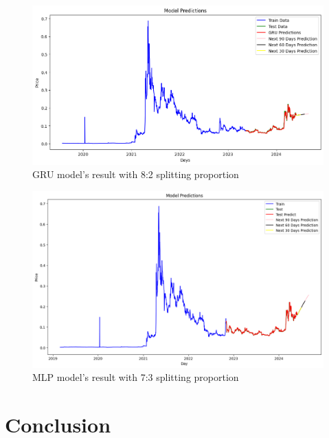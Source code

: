 \documentclass{ieeeojies}
\begin{document}
\begin{figure}[H]
  \centering
  \begin{minipage}{0.8\linewidth}
    \centering
    \includegraphics[width=\linewidth]{Image/GRU/GRU_DOGE_82_n.png}
    \caption{GRU model's result with 8:2 splitting proportion}
    \label{fig:29}
  \end{minipage}
\end{figure}
\vspace{-5mm}
\begin{figure}[H]
  \centering
  \begin{minipage}{0.8\linewidth}
    \centering
    \includegraphics[width=\linewidth]{Image/MLP/MLP_DOGE_73_new.png}
    \caption{MLP model's result with 7:3 splitting proportion}
    \label{fig:30}
  \end{minipage}
\end{figure}
\section{Conclusion}
\end{document}
